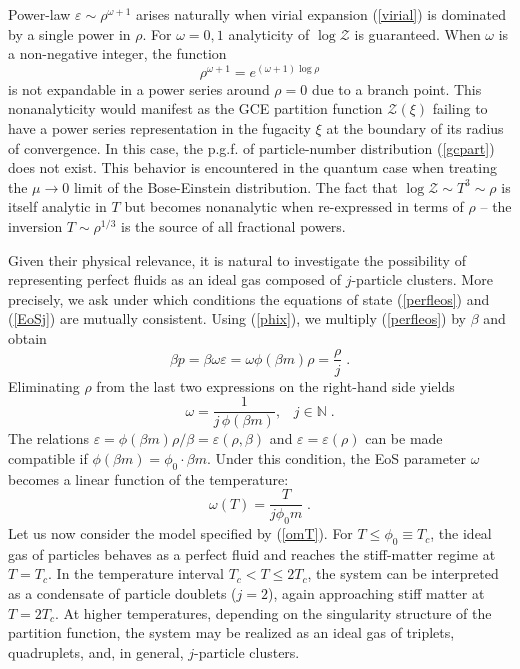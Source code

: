 \documentclass[a4paper,12pt]{amsart}
\theoremstyle{definition}
\theoremstyle{remark}
\begin{document}
Power-law $\varepsilon\sim \rho^{\omega+1}$ arises naturally when virial expansion (\ref{virial}) is dominated  by a single power in $\rho$. For $\omega=0,1$ analyticity of $\log \mathcal{Z}$ is guaranteed. When $\omega$ is a non-negative integer, the function 
\[
\rho^{\omega+1}=e^{(\omega+1)\log \rho}
\]
is not expandable in a power series around $\rho=0$ due to a branch point. This nonanalyticity would manifest as the GCE partition function $\mathcal{Z}(\xi)$  failing to have a power series representation in the fugacity $\xi$ at the boundary of its radius of convergence. In this case, the p.g.f. {} of particle-number distribution (\ref{gcpart}) does not exist. 
This behavior is encountered in the quantum case when treating the  $\mu \to 0$ limit of the Bose-Einstein distribution. The fact that $\log\mathcal{Z} \sim T^3 \sim \rho$
is itself analytic in $T$ but becomes nonanalytic when re-expressed in terms of $\rho$ -- the inversion $T\sim \rho^{1/3}$ is the source of all fractional powers.

Given their physical relevance, it is natural to investigate the possibility of representing perfect fluids as an ideal gas composed of $j$-particle clusters. More precisely, we ask under which conditions the equations of state (\ref{perfleos}) and (\ref{EoSj}) are mutually consistent. Using (\ref{phix}), we multiply (\ref{perfleos}) by $\beta$ and obtain
\begin{equation}\label{perfl}
 \beta p  = \beta \omega \varepsilon = \omega \phi(\beta m)\rho = \frac{\rho}{j}\;.
\end{equation}
Eliminating $\rho$ from the last two expressions on the right-hand side yields
\begin{equation}\label{perfl1}
\omega = \frac{1}{j \,\phi(\beta m)},\;\;\; j\in\mathbb{N}\;.
\end{equation}
The relations $\varepsilon = \phi(\beta m)\rho/\beta = \varepsilon(\rho,\beta)$ and $\varepsilon=\varepsilon(\rho)$ can be made compatible if $\phi(\beta m)=\phi_0 \cdot \beta m$. Under this condition, the EoS parameter $\omega$ becomes a linear function of the temperature:
\begin{equation}\label{omT}
 \omega(T) = \frac{T}{j \phi_0 m}\;.
\end{equation}
Let us now consider the model specified by (\ref{omT}). For $T \leq \phi_0 \equiv T_c$, the ideal gas of particles behaves as a perfect fluid and reaches the stiff-matter regime at $T = T_c$. In the temperature interval $T_c < T \leq 2T_c$, the system can be interpreted as a condensate of particle doublets ($j=2$), again approaching stiff matter at $T = 2T_c$. At higher temperatures, depending on the singularity structure of the partition function, the system may be realized as an ideal gas of triplets, quadruplets, and, in general, $j$-particle clusters.
\end{document}
